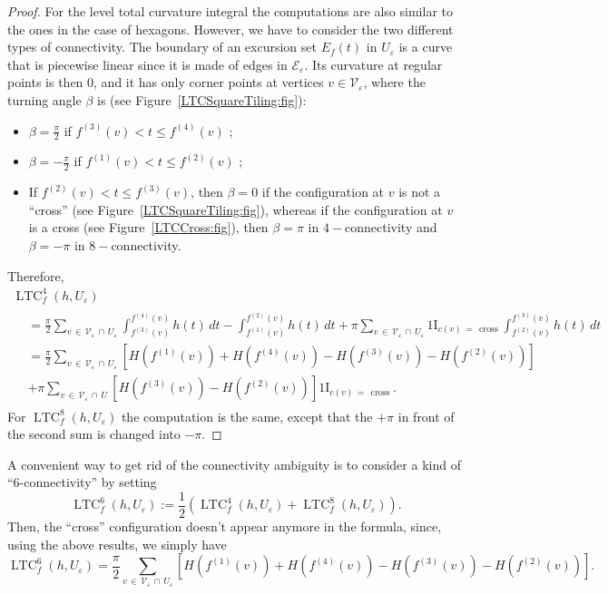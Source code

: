 \documentclass[AHL,Unicode,longabstracts,published]{cedram}
\newcommand{\ind}{{1\!\!\mathrm{I}}}
\newcommand{\eps}{\varepsilon}
\DeclareMathOperator{\LTC}{LTC}
\DeclareMathOperator{\cross}{cross}
\newcommand{\calV}{\mathcal{V}}
\newcommand{\calE}{\mathcal{E}}
\begin{document}
\begin{proof}
For the level total curvature integral the computations are also similar to the ones in the case of hexagons. However, we have to consider the two different types of connectivity. The boundary of an excursion set $E_f(t)$ in $U_\eps$ is a curve that is piecewise linear since it is made of edges in $\calE_\eps$. Its curvature at regular points is then $0$, and it has only corner points at vertices $v\in\calV_\eps$, where the turning angle $\beta$ is (see Figure~\ref{LTCSquareTiling:fig}):
\begin{itemize}
\item $\beta=\frac{\pi}{2}$ if $f^{(3)}(v)<t\leq f^{(4)}(v)$ ;
\item $\beta= - \frac{\pi}{2}$ if $f^{(1)}(v)<t\leq f^{(2)}(v)$ ;
\item If $f^{(2)}(v)<t\leq f^{(3)}(v)$, then $\beta=0$ if the configuration at $v$ is not a ``cross'' (see Figure~\ref{LTCSquareTiling:fig}), whereas if the configuration at $v$ is a cross (see Figure~\ref{LTCCross:fig}), then $\beta=\pi$ in $4-$connectivity and $\beta=-\pi$ in $8-$connectivity.
\end{itemize}



Therefore,
\begin{multline*}
\LTC^4_f(h,U_\eps)\\
\begin{aligned}
& = \frac{\pi}{2} \sum_{v\,\in\,\calV_\eps\,\cap\,U_\eps}
\int_{f^{(3)}(v)}^{f^{(4)}(v)} h(t) \, dt -\int_{f^{(1)}(v)}^{f^{(2)}(v)} h(t) \, dt + \pi
\sum_{v\,\in\,\calV_\eps\,\cap\,U_\eps} \ind_{c(v)\,=\,\cross}
\int_{f^{(2)}(v)}^{f^{(3)}(v)} h(t) \, dt \\
& =
\frac{\pi}{2} \sum_{v\,\in\,\calV_\varepsilon\,\cap\,U_\eps} \left[H\left(f^{(1)}(v)\right) + H\left(f^{(4)}(v)\right)- H\left(f^{(3)}(v)\right) - H\left(f^{(2)}(v)\right)\right] \\
& + \pi
\sum_{v\,\in\,\calV_\eps\,\cap\,U} \left[H\left(f^{(3)}(v)\right) - H\left(f^{(2)}(v)\right)\right]
\ind_{c(v)\,=\,\cross}.
\end{aligned}
\end{multline*}
For $\LTC^8_f(h,U_\eps)$ the computation is the same, except that the $+\pi$ in front of the second sum is changed into $-\pi$.
\end{proof}

A convenient way to get rid of the connectivity ambiguity is to consider a kind of ``6-connectivity'' by setting
\[
\LTC^6_f(h,U_\eps) := \frac{1}{2} \left(\LTC^4_f(h,U_\eps) +\LTC^8_f(h,U_\eps) \right).
\]
Then, the ``cross'' configuration doesn't appear anymore in the formula, since, using the above results, we simply have
\[
\LTC^6_f(h,U_\eps) = \frac{\pi}{2} \sum_{v\,\in\,\calV_\varepsilon\,\cap\,U_\eps} \left[H\left(f^{(1)}(v)\right) +
H\left(f^{(4)}(v)\right)- H\left(f^{(3)}(v)\right) - H\left(f^{(2)}(v)\right)\right].
\]
\end{document}
